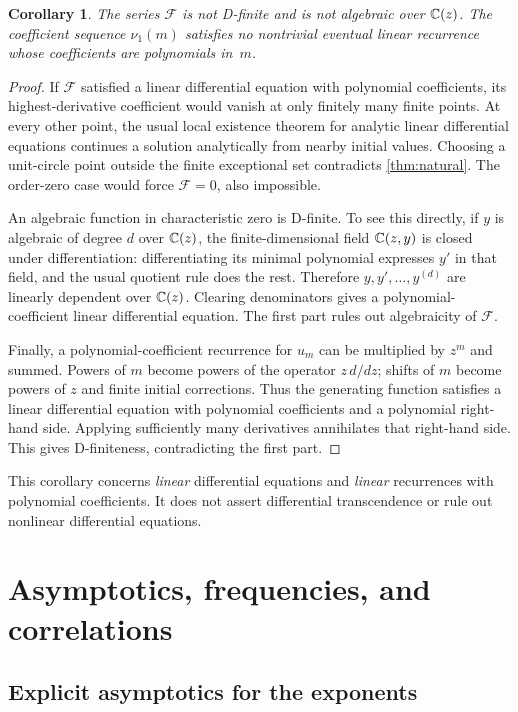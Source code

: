 \documentclass[11pt]{article}
\newtheorem{corollary}[theorem]{Corollary}
\theoremstyle{definition}\newtheorem{definition}[theorem]{Definition}
\theoremstyle{remark}\newtheorem{remark}[theorem]{Remark}
\newcommand{\nuone}{\nu_1}
\newcommand{\F}{\mathcal F}
\begin{document}
\begin{corollary}\label{cor:dfinite}
The series $\F$ is not D-finite and is not algebraic over $\mathbb C(z)$. The coefficient sequence $\nuone(m)$ satisfies no nontrivial eventual linear recurrence whose coefficients are polynomials in~$m$.
\end{corollary}
\begin{proof}
If $\F$ satisfied a linear differential equation with polynomial coefficients, its highest-derivative coefficient would vanish at only finitely many finite points. At every other point, the usual local existence theorem for analytic linear differential equations continues a solution analytically from nearby initial values. Choosing a unit-circle point outside the finite exceptional set contradicts \cref{thm:natural}. The order-zero case would force $\F=0$, also impossible.

An algebraic function in characteristic zero is D-finite. To see this directly, if $y$ is algebraic of degree $d$ over $\mathbb C(z)$, the finite-dimensional field $\mathbb C(z,y)$ is closed under differentiation: differentiating its minimal polynomial expresses $y'$ in that field, and the usual quotient rule does the rest. Therefore $y,y',\ldots,y^{(d)}$ are linearly dependent over $\mathbb C(z)$. Clearing denominators gives a polynomial-coefficient linear differential equation. The first part rules out algebraicity of $\F$.

Finally, a polynomial-coefficient recurrence for $u_m$ can be multiplied by $z^m$ and summed. Powers of $m$ become powers of the operator $z\,d/dz$; shifts of $m$ become powers of $z$ and finite initial corrections. Thus the generating function satisfies a linear differential equation with polynomial coefficients and a polynomial right-hand side. Applying sufficiently many derivatives annihilates that right-hand side. This gives D-finiteness, contradicting the first part.
\end{proof}

This corollary concerns \emph{linear} differential equations and \emph{linear} recurrences with polynomial coefficients. It does not assert differential transcendence or rule out nonlinear differential equations.

\section{Asymptotics, frequencies, and correlations}

\subsection{Explicit asymptotics for the exponents}
\end{document}
